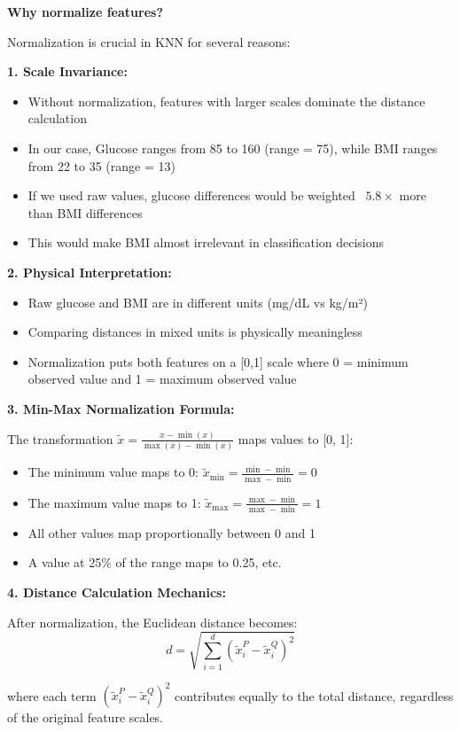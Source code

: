 \documentclass[12pt]{article}
\begin{document}
\begin{explanation}
\textbf{Why normalize features?}

Normalization is crucial in KNN for several reasons:

\textbf{1. Scale Invariance:}
\begin{itemize}
    \item Without normalization, features with larger scales dominate the distance calculation
    \item In our case, Glucose ranges from 85 to 160 (range = 75), while BMI ranges from 22 to 35 (range = 13)
    \item If we used raw values, glucose differences would be weighted ~$5.8 \times$ more than BMI differences
    \item This would make BMI almost irrelevant in classification decisions
\end{itemize}

\textbf{2. Physical Interpretation:}
\begin{itemize}
    \item Raw glucose and BMI are in different units (mg/dL vs kg/m²)
    \item Comparing distances in mixed units is physically meaningless
    \item Normalization puts both features on a [0,1] scale where 0 = minimum observed value and 1 = maximum observed value
\end{itemize}

\textbf{3. Min-Max Normalization Formula:}

The transformation \(\tilde{x} = \frac{x - \min(x)}{\max(x) - \min(x)}\) maps values to [0, 1]:
\begin{itemize}
    \item The minimum value maps to 0: \(\tilde{x}_{\min} = \frac{\min - \min}{\max - \min} = 0\)
    \item The maximum value maps to 1: \(\tilde{x}_{\max} = \frac{\max - \min}{\max - \min} = 1\)
    \item All other values map proportionally between 0 and 1
    \item A value at 25\% of the range maps to 0.25, etc.
\end{itemize}

\textbf{4. Distance Calculation Mechanics:}

After normalization, the Euclidean distance becomes:
\[
d = \sqrt{\sum_{i=1}^{d} (\tilde{x}_i^P - \tilde{x}_i^Q)^2}
\]

where each term \((\tilde{x}_i^P - \tilde{x}_i^Q)^2\) contributes equally to the total distance, regardless of the original feature scales.


\end{explanation}
\end{document}
